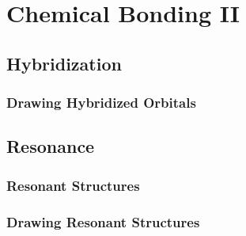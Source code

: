 \documentclass[../main]{subfiles}
\begin{document}
\section{Chemical Bonding II}

\subsection{Hybridization}

\subsubsection{Drawing Hybridized Orbitals}

\subsection{Resonance}

\subsubsection{Resonant Structures}

\subsubsection{Drawing Resonant Structures}
\end{document}

